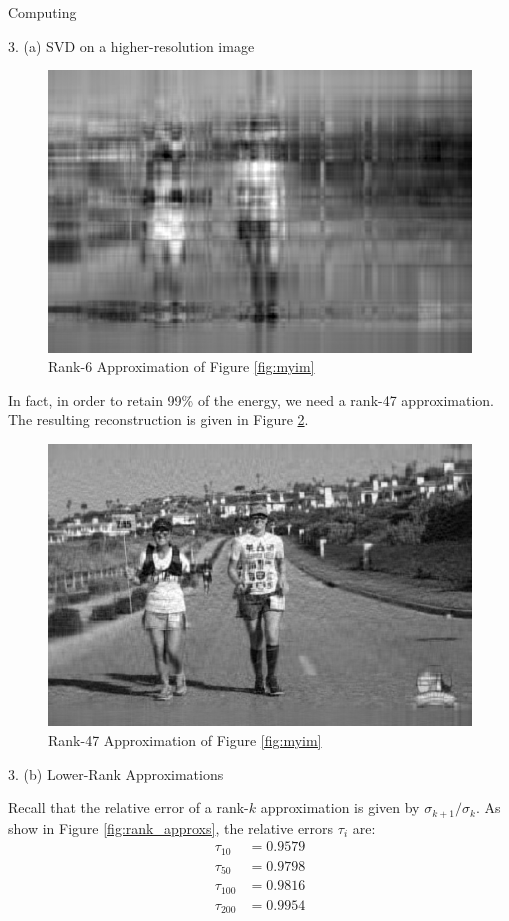 \begin{section}{Computing}
\begin{homeworkSection}{3. (a) SVD on a higher-resolution image}
\begin{figure}[H]
\centering
\includegraphics[width=0.90\columnwidth]{../data/rank_6_approx}
\caption{Rank-6 Approximation of Figure \ref{fig:myim}}
\label{fig:rank_6}
\end{figure}

In fact, in order to retain 99\% of the energy, we need a rank-47 approximation. The resulting reconstruction is given in Figure \ref{fig:rank_47}.

\begin{figure}[H]
\centering
\includegraphics[width=0.90\columnwidth]{../data/rank_47_approx}
\caption{Rank-47 Approximation of Figure \ref{fig:myim}}
\label{fig:rank_47}
\end{figure}

\end{homeworkSection}

\begin{homeworkSection}{3. (b) Lower-Rank Approximations}

Recall that the relative error of a rank-$k$ approximation is given by $\sigma_{k+1} / \sigma_k$. As show in Figure \ref{fig:rank_approxs}, the relative errors $\tau_i$ are:
\begin{align*}
    \tau_{10} &= 0.9579 \\ 
    \tau_{50} &= 0.9798 \\ 
    \tau_{100} &= 0.9816 \\ 
    \tau_{200} &= 0.9954 \\ 
\end{align*}


\end{homeworkSection}
\end{section}
